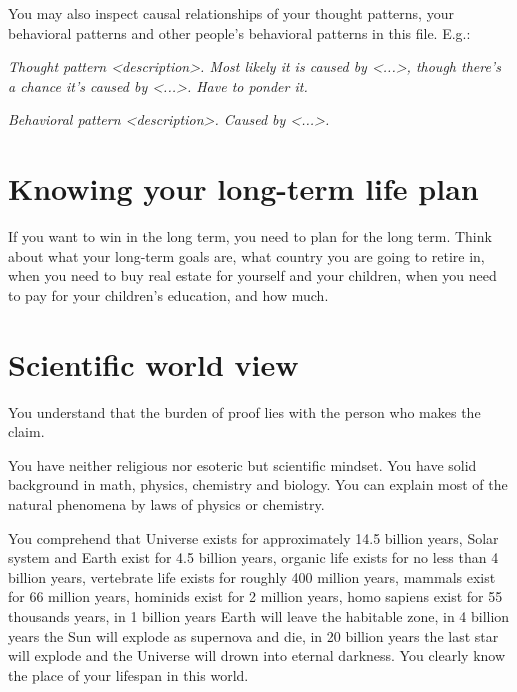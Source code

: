\documentclass[11pt]{article}
\theoremstyle{remark}
\theoremstyle{definition}
\begin{document}
You may also inspect causal relationships of your thought patterns, your behavioral patterns and other people's behavioral patterns in this file. E.g.: 

\textit{Thought pattern <description>. Most likely it is caused by <...>, though there's a chance it's caused by <...>. Have to ponder it.}

\textit{Behavioral pattern <description>. Caused by <...>.}












\section{Knowing your long-term life plan}




If you want to win in the long term, you need to plan for the long term. Think about what your long-term goals are, what country you are going to retire in, when you need to buy real estate for yourself and your children, when you need to pay for your children's education, and how much.




\section{Scientific world view}


You understand that the burden of proof lies with the person who makes the claim.

You have neither religious nor esoteric but scientific mindset. You have solid background in math, physics, chemistry and biology. You can explain most of the natural phenomena by laws of physics or chemistry.

You comprehend that Universe exists for approximately 14.5 billion years, Solar system and Earth exist for 4.5 billion years, organic life exists for no less than 4 billion years, vertebrate life exists for roughly 400 million years, mammals exist for 66 million years, hominids exist for 2 million years, homo sapiens exist for 55 thousands years, in 1 billion years Earth will leave the habitable zone, in 4 billion years the Sun will explode as supernova and die, in 20 billion years the last star will explode and the Universe will drown into eternal darkness. You clearly know the place of your lifespan in this world. 
\end{document}
